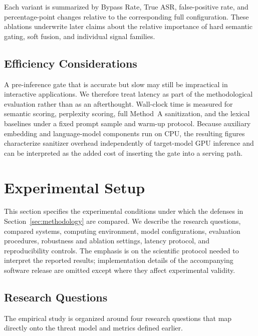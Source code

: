 ﻿\documentclass[10pt]{article}
\begin{document}
Each variant is summarized by Bypass Rate, True ASR, false-positive rate, and percentage-point changes relative to the corresponding full configuration.
These ablations underwrite later claims about the relative importance of hard semantic gating, soft fusion, and individual signal families.

\subsection{Efficiency Considerations}
\label{sec:runtime}

A pre-inference gate that is accurate but slow may still be impractical in interactive applications.
We therefore treat latency as part of the methodological evaluation rather than as an afterthought.
Wall-clock time is measured for semantic scoring, perplexity scoring, full Method~A sanitization, and the lexical baselines under a fixed prompt sample and warm-up protocol.
Because auxiliary embedding and language-model components run on CPU, the resulting figures characterize sanitizer overhead independently of target-model GPU inference and can be interpreted as the added cost of inserting the gate into a serving path.



\section{Experimental Setup}
\label{sec:experimental-setup}

This section specifies the experimental conditions under which the defenses in Section~\ref{sec:methodology} are compared.
We describe the research questions, compared systems, computing environment, model configurations, evaluation procedures, robustness and ablation settings, latency protocol, and reproducibility controls.
The emphasis is on the scientific protocol needed to interpret the reported results; implementation details of the accompanying software release are omitted except where they affect experimental validity.

\subsection{Research Questions}
\label{sec:rq}

The empirical study is organized around four research questions that map directly onto the threat model and metrics defined earlier.
\end{document}
